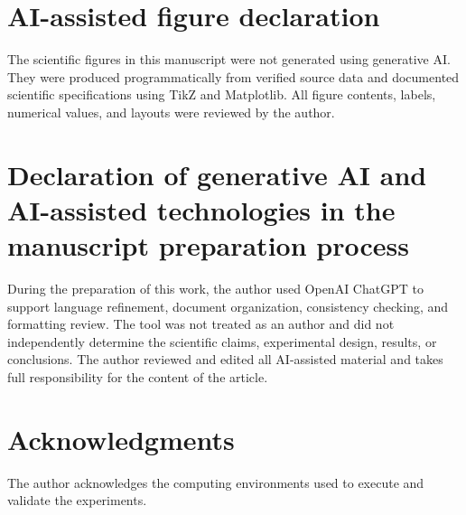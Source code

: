\documentclass[preprint,12pt]{elsarticle}
\begin{document}
\section*{AI-assisted figure declaration}
The scientific figures in this manuscript were not generated using generative AI. They were produced programmatically from verified source data and documented scientific specifications using TikZ and Matplotlib. All figure contents, labels, numerical values, and layouts were reviewed by the author.

\section*{Declaration of generative AI and AI-assisted technologies in the manuscript preparation process}
During the preparation of this work, the author used OpenAI ChatGPT to support language refinement, document organization, consistency checking, and formatting review. The tool was not treated as an author and did not independently determine the scientific claims, experimental design, results, or conclusions. The author reviewed and edited all AI-assisted material and takes full responsibility for the content of the article.

\section*{Acknowledgments}
The author acknowledges the computing environments used to execute and validate the experiments.

\FloatBarrier


\end{document}
